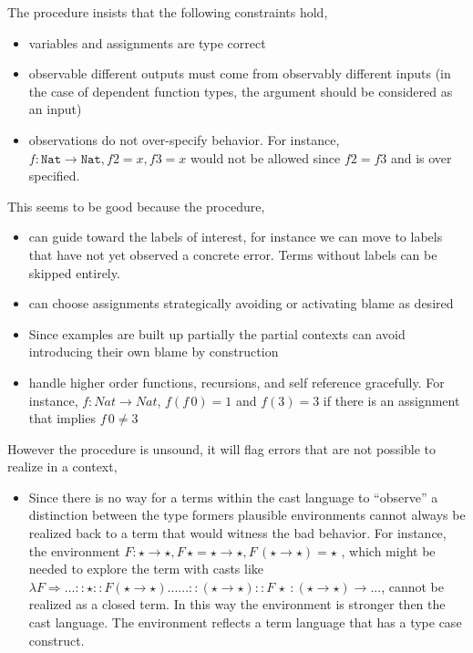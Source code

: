 The procedure insists that the following constraints hold, 
\begin{itemize}
\item variables and assignments are type correct
\item observable different outputs must come from observably different inputs
(in the case of dependent function types, the argument should be considered
as an input)
\item observations do not over-specify behavior. For instance, $f:\mathtt{Nat}\rightarrow\mathtt{Nat},f2=x,f3=x$
would not be allowed since $f2=f3$ and is over specified.
\end{itemize}
This seems to be good because the procedure,
\begin{itemize}
\item can guide toward the labels of interest, for instance we can move
to labels that have not yet observed a concrete error. Terms without
labels can be skipped entirely.
\item can choose assignments strategically avoiding or activating blame
as desired
\item Since examples are built up partially the partial contexts can avoid
introducing their own blame by construction
\item handle higher order functions, recursions, and self reference gracefully.
For instance, $f:Nat\rightarrow Nat$, $f\left(f\,0\right)=1$ and
$f\left(3\right)=3$ if there is an assignment that implies $f\,0\neq3$
\end{itemize}
However the procedure is unsound, it will flag errors that are not
possible to realize in a context,
\begin{itemize}
\item Since there is no way for a terms within the cast language to ``observe''
a distinction between the type formers plausible environments cannot
always be realized back to a term that would witness the bad behavior.
For instance, the environment $F:\star\rightarrow\star,F\,\star=\star\rightarrow\star,F\,\left(\star\rightarrow\star\right)=\star$
, which might be needed to explore the term with casts like $\lambda F\Rightarrow...::\star::F\left(\star\rightarrow\star\right)......::\left(\star\rightarrow\star\right)::F\,\star\ :\left(\star\rightarrow\star\right)\rightarrow...$,
cannot be realized as a closed term. In this way the environment is
stronger then the cast language. The environment reflects a term language
that has a type case construct. 
\end{itemize}
